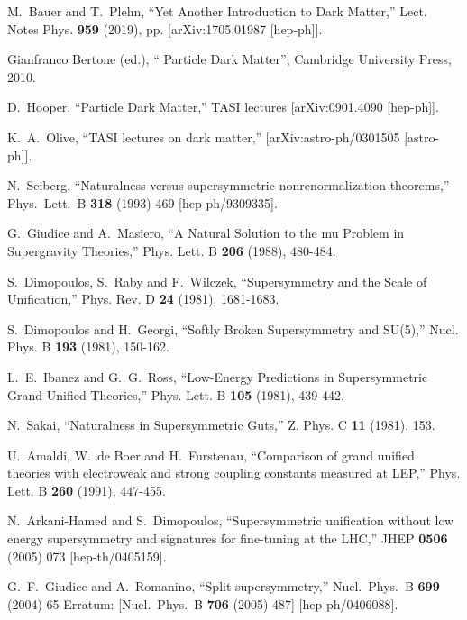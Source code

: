 \documentclass[12pt]{article}
\numberwithin{equation}{section}
\begin{document}
\begin{thebibliography}{999}
M.~Bauer and T.~Plehn,
``Yet Another Introduction to Dark Matter,''
Lect. Notes Phys. \textbf{959} (2019), pp.
[arXiv:1705.01987 [hep-ph]].

Gianfranco Bertone (ed.), `` Particle Dark Matter'', Cambridge University Press, 2010.

D.~Hooper,
``Particle Dark Matter,'' TASI lectures
[arXiv:0901.4090 [hep-ph]].

K.~A.~Olive,
``TASI lectures on dark matter,''
[arXiv:astro-ph/0301505 [astro-ph]].

  N.~Seiberg, ``Naturalness versus supersymmetric nonrenormalization theorems,''
  Phys.\ Lett.\ B {\bf 318} (1993) 469 [hep-ph/9309335].

G.~Giudice and A.~Masiero,
``A Natural Solution to the mu Problem in Supergravity Theories,'' Phys. Lett. B \textbf{206} (1988), 480-484.

S.~Dimopoulos, S.~Raby and F.~Wilczek,
``Supersymmetry and the Scale of Unification,''
Phys. Rev. D \textbf{24} (1981), 1681-1683.

S.~Dimopoulos and H.~Georgi,
``Softly Broken Supersymmetry and SU(5),''
Nucl. Phys. B \textbf{193} (1981), 150-162.

L.~E.~Ibanez and G.~G.~Ross,
``Low-Energy Predictions in Supersymmetric Grand Unified Theories,''
Phys. Lett. B \textbf{105} (1981), 439-442.

N.~Sakai, ``Naturalness in Supersymmetric Guts,''
Z. Phys. C \textbf{11} (1981), 153.

U.~Amaldi, W.~de Boer and H.~Furstenau,
``Comparison of grand unified theories with electroweak and strong coupling constants measured at LEP,''
Phys. Lett. B \textbf{260} (1991), 447-455.

  N.~Arkani-Hamed and S.~Dimopoulos,
  ``Supersymmetric unification without low energy supersymmetry and 
  signatures for fine-tuning at the LHC,'' JHEP {\bf 0506} (2005) 073
  [hep-th/0405159].

  G.~F.~Giudice and A.~Romanino,
  ``Split supersymmetry,''
  Nucl.\ Phys.\ B {\bf 699} (2004) 65
  Erratum: [Nucl.\ Phys.\ B {\bf 706} (2005) 487] [hep-ph/0406088].


\end{thebibliography}
\end{document}
